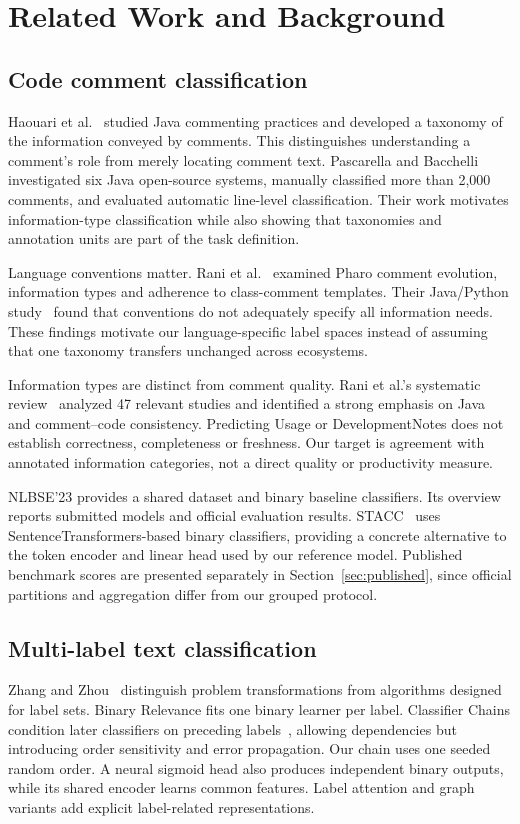 \section{Related Work and Background}
\subsection{Code comment classification}
Haouari et al.~\cite{haouari} studied Java commenting practices and developed a taxonomy of the information conveyed by comments. This distinguishes understanding a comment's role from merely locating comment text. Pascarella and Bacchelli~\cite{pascarella} investigated six Java open-source systems, manually classified more than 2,000 comments, and evaluated automatic line-level classification. Their work motivates information-type classification while also showing that taxonomies and annotation units are part of the task definition.

Language conventions matter. Rani et al.~\cite{rani_pharo} examined Pharo comment evolution, information types and adherence to class-comment templates. Their Java/Python study~\cite{rani_conventions} found that conventions do not adequately specify all information needs. These findings motivate our language-specific label spaces instead of assuming that one taxonomy transfers unchanged across ecosystems.

Information types are distinct from comment quality. Rani et al.'s systematic review~\cite{rani_review} analyzed 47 relevant studies and identified a strong emphasis on Java and comment--code consistency. Predicting Usage or DevelopmentNotes does not establish correctness, completeness or freshness. Our target is agreement with annotated information categories, not a direct quality or productivity measure.

NLBSE'23 provides a shared dataset and binary baseline classifiers. Its overview~\cite{nlbse_overview} reports submitted models and official evaluation results. STACC~\cite{stacc} uses SentenceTransformers-based binary classifiers, providing a concrete alternative to the token encoder and linear head used by our reference model. Published benchmark scores are presented separately in Section~\ref{sec:published}, since official partitions and aggregation differ from our grouped protocol.

\subsection{Multi-label text classification}
Zhang and Zhou~\cite{mlreview} distinguish problem transformations from algorithms designed for label sets. Binary Relevance fits one binary learner per label. Classifier Chains condition later classifiers on preceding labels~\cite{chains}, allowing dependencies but introducing order sensitivity and error propagation. Our chain uses one seeded random order. A neural sigmoid head also produces independent binary outputs, while its shared encoder learns common features. Label attention and graph variants add explicit label-related representations.

